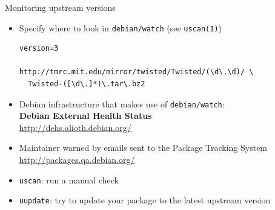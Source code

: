 \documentclass[10pt,final]{beamer}
\begin{document}
\begin{frame}[fragile]{Monitoring upstream versions}
  \begin{itemize}
  \item Specify where to look in \texttt{debian/watch} (see \texttt{uscan(1)})
    \begin{lstlisting}[basicstyle=\ttfamily\footnotesize]
version=3

http://tmrc.mit.edu/mirror/twisted/Twisted/(\d\.\d)/ \
  Twisted-([\d\.]*)\.tar\.bz2
    \end{lstlisting}
    \br
  \item Debian infrastructure that makes use of \texttt{debian/watch}:\\
    \textbf{Debian External Health Status}\\
    \url{http://dehs.alioth.debian.org/}
    \br
  \item Maintainer warned by emails sent to the Package Tracking System\\
    \url{http://packages.qa.debian.org/}
    \br
  \item \texttt{uscan}: run a manual check
    \br
  \item \texttt{uupdate}: try to update your package to the latest upstream version
  \end{itemize}
\end{frame}
\end{document}
